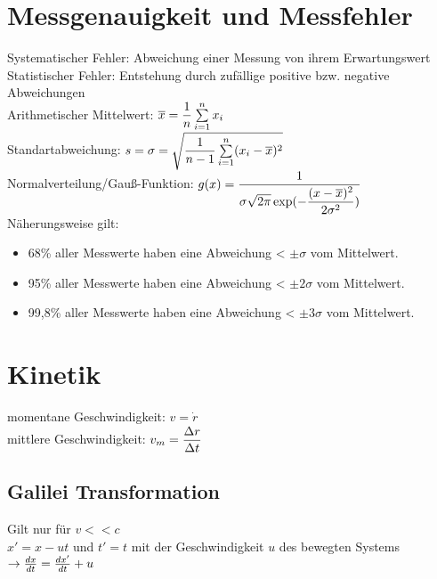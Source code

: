 \documentclass[fs, footer]{latex4ei}
\begin{document}
\vspace{-4mm}
\begin{multicols*}{4}

\section{Messgenauigkeit und Messfehler}
Systematischer Fehler: Abweichung einer Messung von ihrem Erwartungswert\\
Statistischer Fehler: Entstehung durch zufällige positive bzw. negative Abweichungen\\
Arithmetischer Mittelwert: $\ol x = \fr{1}{n}\sum_{i=1}^n x_i$\\
Standartabweichung: $s = \sigma = \sqrt{\fr{1}{n-1}\sum_{i=1}^n (x_i-\ol x)^2}$\\
Normalverteilung/Gauß-Funktion: $g(x) = \dfrac{1}{\sigma \sqrt{2\pi}\exp(-\dfrac{(x-\overline{x})^2}{2\sigma^2})}$\\
Näherungsweise gilt: 
\begin{itemize}
\item 68\% aller Messwerte haben eine Abweichung < $\pm \sigma$ vom Mittelwert.
\item 95\% aller Messwerte haben eine Abweichung < $\pm 2\sigma$ vom Mittelwert.
\item 99,8\% aller Messwerte haben eine Abweichung < $\pm 3\sigma$ vom Mittelwert.
\end{itemize}
\section{Kinetik}
momentane Geschwindigkeit: $v = \dot r$\\
mittlere Geschwindigkeit: $v_m = \dfrac{\Delta r}{\Delta t}$\\
\subsection{Galilei Transformation}
Gilt nur für $v<<c$\\
$x' = x - ut$ und $t' = t$ mit der Geschwindigkeit $u$ des bewegten Systems $\rightarrow \frac{dx}{dt} = \frac{dx'}{dt} + u$\\

\end{multicols*}
\end{document}
